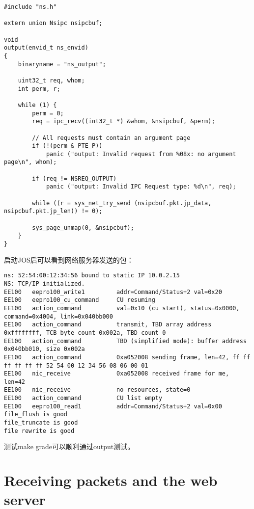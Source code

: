 \documentclass{article}
\begin{document}
\begin{CJK*}{UTF8}{gkai}
\begin{lstlisting}[style=ccode, title={\scriptsize \ttfamily \bfseries net/output.c}]
#include "ns.h"

extern union Nsipc nsipcbuf;

void
output(envid_t ns_envid)
{
    binaryname = "ns_output";

    uint32_t req, whom;
    int perm, r;

    while (1) {
        perm = 0;
        req = ipc_recv((int32_t *) &whom, &nsipcbuf, &perm);
    
        // All requests must contain an argument page
        if (!(perm & PTE_P))
            panic ("output: Invalid request from %08x: no argument page\n", whom);

        if (req != NSREQ_OUTPUT)
            panic ("output: Invalid IPC Request type: %d\n", req);

        while ((r = sys_net_try_send (nsipcbuf.pkt.jp_data, nsipcbuf.pkt.jp_len)) != 0);

        sys_page_unmap(0, &nsipcbuf);
    }
}
\end{lstlisting}

启动JOS后可以看到网络服务器发送的包：

\vspace{1em}

\begin{lstlisting}[style=console, basicstyle=\tiny\color{green}\ttfamily\bfseries]
ns: 52:54:00:12:34:56 bound to static IP 10.0.2.15
NS: TCP/IP initialized.
EE100	eepro100_write1         addr=Command/Status+2 val=0x20
EE100	eepro100_cu_command     CU resuming
EE100	action_command          val=0x10 (cu start), status=0x0000, command=0x4004, link=0x040bb000
EE100	action_command          transmit, TBD array address 0xffffffff, TCB byte count 0x002a, TBD count 0
EE100	action_command          TBD (simplified mode): buffer address 0x040bb010, size 0x002a
EE100	action_command          0xa052008 sending frame, len=42, ff ff ff ff ff ff 52 54 00 12 34 56 08 06 00 01
EE100	nic_receive             0xa052008 received frame for me, len=42
EE100	nic_receive             no resources, state=0
EE100	action_command          CU list empty
EE100	eepro100_read1          addr=Command/Status+2 val=0x00
file_flush is good
file_truncate is good
file rewrite is good
\end{lstlisting}

测试make grade可以顺利通过output测试。


\section{Receiving packets and the web server}



\end{CJK*}
\end{document}
